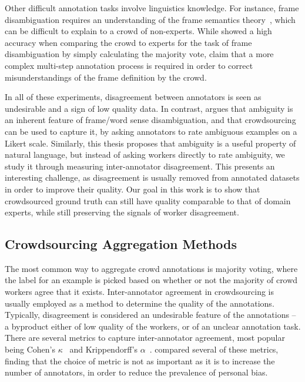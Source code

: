 Other difficult annotation tasks involve linguistics knowledge. For instance, frame disambiguation requires an understanding of the frame semantics theory~\cite{baker1998berkeley}, which can be difficult to explain to a crowd of non-experts. While \citet{Hong:2011:GCR:2018966.2018970} showed a high accuracy when comparing the crowd to experts for the task of frame disambiguation by simply calculating the majority vote, \citet{chang2015scaling} claim that a more complex multi-step annotation process is required in order to correct misunderstandings of the frame definition by the crowd.

In all of these experiments, disagreement between annotators is seen as undesirable and a sign of low quality data. In contrast, \citet{jurgens2013embracing} argues that ambiguity is an inherent feature of frame/word sense disambiguation, and that crowdsourcing can be used to capture it, by asking annotators to rate ambiguous examples on a Likert scale. Similarly, this thesis proposes that ambiguity is a useful property of natural language, but instead of asking workers directly to rate ambiguity, we study it through measuring inter-annotator disagreement. This presents an interesting challenge, as disagreement is usually removed from annotated datasets in order to improve their quality. Our goal in this work is to show that crowdsourced ground truth can still have quality comparable to that of domain experts, while still preserving the signals of worker disagreement.


\subsection{Crowdsourcing Aggregation Methods}

The most common way to aggregate crowd annotations is majority voting, where the label for an example is picked based on whether or not the majority of crowd workers agree that it exists. Inter-annotator agreement in crowdsourcing is usually employed as a method to determine the quality of the annotations. Typically, disagreement is considered an undesirable feature of the annotations -- a byproduct either of low quality of the workers, or of an unclear annotation task. There are several metrics to capture inter-annotator agreement, most popular being Cohen's $\kappa$~\cite{cohen1960kappa} and Krippendorff's $\alpha$~\cite{klaus2013content}. \citet{artstein2008inter} compared several of these metrics, finding that the choice of metric is not as important as it is to increase the number of annotators, in order to reduce the prevalence of personal bias.

